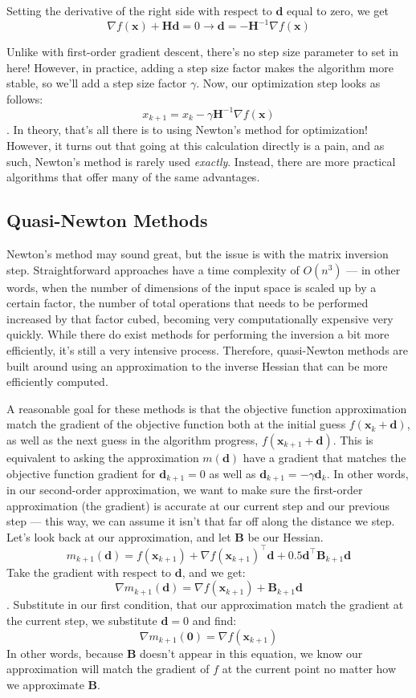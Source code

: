 \documentclass[12pt]{article}
\begin{document}
Setting the derivative of the right side with respect to \(\mathbf{d}\) equal to zero, we get 
\[\nabla f(\mathbf{x}) + \mathbf{Hd} = 0 \to \mathbf{d} = -\mathbf{H}^{-1} \nabla f(\mathbf{x})\]

Unlike with first-order gradient descent, there's no step size parameter to set in here! However, in practice,
adding a step size factor makes the algorithm more stable, so we'll add a step size factor $\gamma$. Now, our optimization step looks
as follows:
\[x_{k+1} = x_{k} - \gamma \mathbf{H}^{-1} \nabla f(\mathbf{x})\].
In theory, that's all there is to using Newton's method for optimization! However, it turns out that going at this calculation directly
is a pain, and as such, Newton's method is rarely used \textit{exactly}. Instead, there are more practical algorithms
that offer many of the same advantages.

\subsection{Quasi-Newton Methods}

Newton's method may sound great, but the issue is with the matrix inversion step. Straightforward approaches have a time complexity 
of \(O(n^3)\) --- in other words, when the number of dimensions of the input space is scaled up by a certain
factor, the number of total operations that needs to be performed increased by that factor cubed, becoming 
very computationally expensive very quickly. While there do exist methods for performing the inversion a bit more efficiently, it's still a very intensive
process. Therefore, quasi-Newton methods are built around
using an approximation to the inverse Hessian that can be more efficiently computed.

A reasonable goal for these methods is that the objective function approximation match the gradient of the objective function both
at the initial guess \(f(\mathbf{x}_k + \mathbf{d})\), as well as the next guess in the algorithm progress, 
\(f(\mathbf{x}_{k+1} + \mathbf{d})\). This is equivalent to asking the approximation \(m(\mathbf{d})\) have a gradient
that matches the objective function gradient for \(\mathbf{d}_{k+1} = 0\) as well as \(\mathbf{d}_{k+1} = - \gamma \mathbf{d}_k\). In other words, in
our second-order approximation, we want to make sure the first-order approximation (the gradient) is accurate at our current step
and our previous step --- this way, we can assume it isn't that far off along the distance we step. Let's look back at our approximation, 
and let \(\mathbf{B}\) be our Hessian.
\[m_{k+1}(\mathbf{d}) = f(\mathbf{x}_{k+1}) + \nabla f(\mathbf{x}_{k+1})^\top \mathbf{d} + 0.5 \mathbf{d}^\top \mathbf{B}_{k+1} \mathbf{d}\]
Take the gradient with respect to \(\mathbf{d}\), and we get:
\[\nabla m_{k+1}(\mathbf{d}) = \nabla f(\mathbf{x}_{k+1}) + \mathbf{B}_{k+1} \mathbf{d}\].
Substitute in our first condition, that our approximation match the gradient at the current step, we substitute \(\mathbf{d} = 0\) and find:
\[\nabla m_{k+1}(\mathbf{0}) = \nabla f(\mathbf{x}_{k+1})\]
In other words, because \(\mathbf{B}\) doesn't appear in this equation, we know
our approximation will match the gradient of \(f\) at the current point no matter how we approximate \(\mathbf{B}\). 
\end{document}
